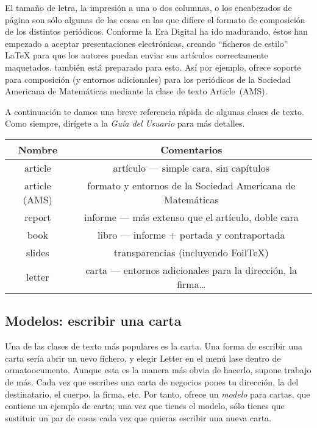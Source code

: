 El tamaño de letra, la impresión a una o dos columnas, o los encabezados
de página son sólo algunas de las cosas en las que difiere el formato
de composición de los distintos periódicos. Conforme la Era Digital
ha ido madurando, éstos han empezado a aceptar presentaciones electrónicas,
creando {}``ficheros de estilo'' \LaTeX{} para que los autores puedan
enviar sus artículos correctamente maquetados. \LyX{} también está
preparado para esto. Así por ejemplo, ofrece soporte para composición
(y entornos adicionales) para los periódicos de la Sociedad Americana
de Matemáticas mediante la clase de texto \textsf{Article~(AMS).}

A continuación te damos una breve referencia rápida de algunas clases
de texto. Como siempre, dirígete a la \emph{Guía del Usuario} para
más detalles.

\vspace{0.3cm}
\begin{center}\begin{tabular}{|c|c|}
\hline 
Nombre&
Comentarios\tabularnewline
\hline
\hline 
article&
artículo --- simple cara, sin capítulos\tabularnewline
\hline 
article (AMS)&
formato y entornos de la Sociedad Americana de Matemáticas\tabularnewline
\hline 
report&
informe --- más extenso que el artículo, doble cara\tabularnewline
\hline 
book&
libro --- informe + portada y contraportada\tabularnewline
\hline
slides&
transparencias (incluyendo Foil\TeX{})\tabularnewline
\hline
letter&
carta --- entornos adicionales para la dirección, la firma\ldots{}\tabularnewline
\hline
\end{tabular}\end{center}
\vspace{0.3cm}


\subsection{Modelos: escribir una carta}

Una de las clases de texto más populares es la carta. Una forma de
escribir una carta sería abrir un \textsf{}\textsf{uevo}
fichero, y elegir \textsf{Letter} en el menú \textsf{}\textsf{lase}
dentro de \textsf{}\textsf{ormato\lyxarrow{}}\textsf{}\textsf{ocumento}.
Aunque esta es la manera más obvia de hacerlo, supone trabajo de más.
Cada vez que escribes una carta de negocios pones tu dirección, la
del destinatario, el cuerpo, la firma, etc. Por tanto, \LyX{} ofrece
un \emph{modelo} para cartas, que contiene un ejemplo de carta; una
vez que tienes el modelo, sólo tienes que sustituir un par de cosas
cada vez que quieras escribir una nueva carta.

